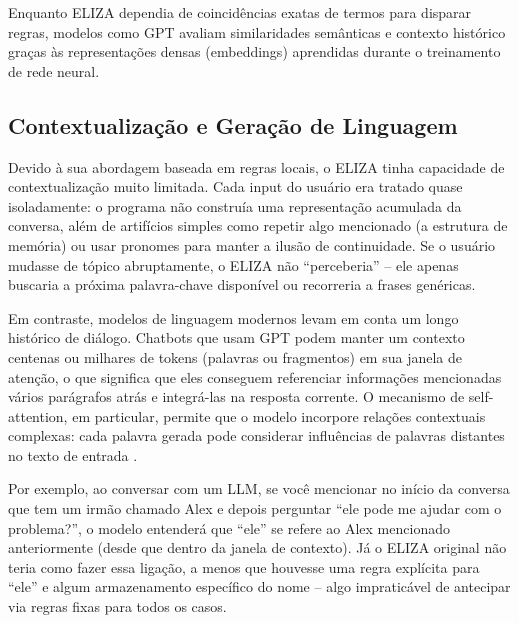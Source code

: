 \documentclass[a4paper,oneside]{book}
\begin{document}
Enquanto ELIZA dependia de coincidências exatas de termos para disparar regras, modelos como GPT avaliam similaridades semânticas e contexto histórico graças às representações densas (embeddings) aprendidas durante o treinamento de rede neural.

\subsection{Contextualização e Geração de Linguagem}

Devido à sua abordagem baseada em regras locais, o ELIZA tinha capacidade de contextualização muito limitada. Cada input do usuário era tratado quase isoladamente: o programa não construía uma representação acumulada da conversa, além de artifícios simples como repetir algo mencionado (a estrutura de memória) ou usar pronomes para manter a ilusão de continuidade. Se o usuário mudasse de tópico abruptamente, o ELIZA não “perceberia” – ele apenas buscaria a próxima palavra-chave disponível ou recorreria a frases genéricas.

Em contraste, modelos de linguagem modernos levam em conta um longo histórico de diálogo. Chatbots que usam GPT podem manter um contexto centenas ou milhares de tokens (palavras ou fragmentos) em sua janela de atenção, o que significa que eles conseguem referenciar informações mencionadas vários parágrafos atrás e integrá-las na resposta corrente. O mecanismo de self-attention, em particular, permite que o modelo incorpore relações contextuais complexas: cada palavra gerada pode considerar influências de palavras distantes no texto de entrada \cite{Vaswani2017}.

Por exemplo, ao conversar com um LLM, se você mencionar no início da conversa que tem um irmão chamado Alex e depois perguntar “ele pode me ajudar com o problema?”, o modelo entenderá que “ele” se refere ao Alex mencionado anteriormente (desde que dentro da janela de contexto). Já o ELIZA original não teria como fazer essa ligação, a menos que houvesse uma regra explícita para “ele” e algum armazenamento específico do nome – algo impraticável de antecipar via regras fixas para todos os casos.
\end{document}
